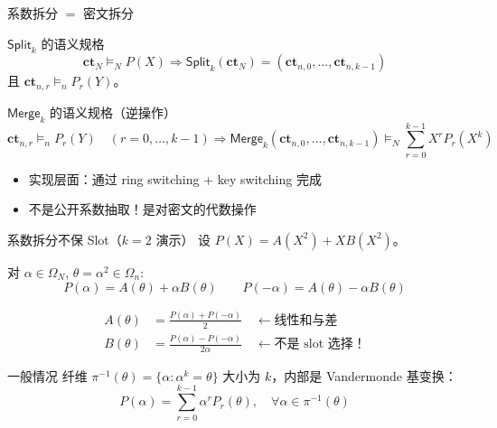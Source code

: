 \documentclass[aspectratio=169, 10pt, xcolor=svgnames, table, UTF8]{ctexbeamer}
\newcommand{\vDashsym}{\mathrel{\vDash}}
\newcommand{\splitop}{\mathsf{Split}}
\newcommand{\mergeop}{\mathsf{Merge}}
\begin{document}
\begin{frame}{系数拆分 \(=\) 密文拆分}
  \begin{block}{\(\splitop_k\) 的语义规格}
    \[
    \mathbf{ct}_N \vDashsym_N P(X)
    \Longrightarrow
    \splitop_k(\mathbf{ct}_N) = (\mathbf{ct}_{n,0}, \ldots, \mathbf{ct}_{n,k-1})
    \]
    且 \(\mathbf{ct}_{n,r} \vDashsym_n P_r(Y)\)。
  \end{block}
  
  \pause
  
  \begin{block}{\(\mergeop_k\) 的语义规格（逆操作）}
    \[
    \mathbf{ct}_{n,r} \vDashsym_n P_r(Y) \quad (r=0,\ldots,k-1)
    \Longrightarrow
    \mergeop_k(\mathbf{ct}_{n,0}, \ldots, \mathbf{ct}_{n,k-1})
    \vDashsym_N \sum_{r=0}^{k-1} X^r P_r(X^k)
    \]
  \end{block}
  
  \begin{itemize}
    \item 实现层面：通过 ring switching + key switching 完成
    \item 不是公开系数抽取！是对密文的代数操作
  \end{itemize}
\end{frame}

\begin{frame}{系数拆分不保 Slot（\(k=2\) 演示）}
  设 \(P(X) = A(X^2) + X B(X^2)\)。
  
  对 \(\alpha \in \Omega_N\), \(\theta = \alpha^2 \in \Omega_n\):
  \[
  P(\alpha) = A(\theta) + \alpha B(\theta)
  \qquad
  P(-\alpha) = A(\theta) - \alpha B(\theta)
  \]
  
  \pause
  
  \begin{align*}
    A(\theta) &= \frac{P(\alpha) + P(-\alpha)}{2} \quad\leftarrow \text{线性和与差}\\
    B(\theta) &= \frac{P(\alpha) - P(-\alpha)}{2\alpha} \quad\leftarrow \text{不是 slot 选择！}
  \end{align*}
  
  \pause
  
  \begin{alertblock}{一般情况}
    纤维 \(\pi^{-1}(\theta) = \{\alpha : \alpha^k = \theta\}\) 大小为 \(k\)，内部是 Vandermonde 基变换：
    \[
    P(\alpha) = \sum_{r=0}^{k-1} \alpha^r P_r(\theta), \quad \forall \alpha \in \pi^{-1}(\theta)
    \]
  \end{alertblock}
\end{frame}
\end{document}
